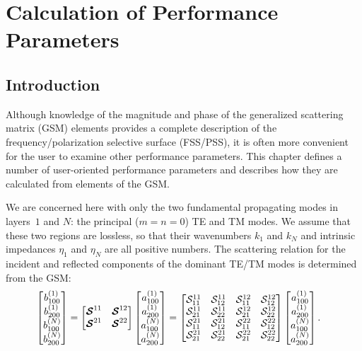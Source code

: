 \chapter{Calculation of Performance Parameters}
\label{chap:performance}

\section{Introduction}
Although knowledge of the magnitude and phase
of the generalized scattering matrix (GSM) elements provides a
complete description of the frequency/polarization selective surface (FSS/PSS),
it is often more convenient for the user to examine other performance
parameters. This chapter defines a number of user-oriented
performance parameters and describes how they are calculated from
elements of the GSM.

We are concerned here with only the two fundamental propagating modes in
layers~$1$ and $N$: the principal ($m=n=0$) TE and TM modes.  We 
assume that these two regions are lossless, so that their wavenumbers 
$k_1$ and $k_N$ and intrinsic impedances $\eta_1$ and $\eta_N$ are
all positive numbers. The
scattering relation for the incident and reflected components of the
dominant TE/TM modes is determined from the GSM:
  \begin{align}
    \begin{bmatrix} b^{(1)}_{100} \\ b^{(1)}_{200} \\ b^{(N)}_{100} \\ b^{(N)}_{200} \end{bmatrix} 
    &= 
    \begin{bmatrix}
      \boldsymbol{\mathcal{S}}^{11} & \boldsymbol{\mathcal{S}}^{12}    \\
      \boldsymbol{\mathcal{S}}^{21} & \boldsymbol{\mathcal{S}}^{22}    
    \end{bmatrix}
    \begin{bmatrix} a^{(1)}_{100} \\ a^{(1)}_{200} \\ a^{(N)}_{100} \\ a^{(N)}_{200} \end{bmatrix} 
    =
    \begin{bmatrix}
      \mathcal{S}^{11}_{11} & \mathcal{S}^{11}_{12} & \mathcal{S}^{12}_{11}
      & \mathcal{S}^{12}_{12} \\ 
      \mathcal{S}^{11}_{21} & \mathcal{S}^{11}_{22} & \mathcal{S}^{12}_{21}
      & \mathcal{S}^{12}_{22} \\ 
      \mathcal{S}^{21}_{11} & \mathcal{S}^{21}_{12} & \mathcal{S}^{22}_{11}
      & \mathcal{S}^{22}_{12} \\ 
      \mathcal{S}^{21}_{21} & \mathcal{S}^{21}_{22} & \mathcal{S}^{22}_{21}
      & \mathcal{S}^{22}_{22} 
    \end{bmatrix}
    \begin{bmatrix} a^{(1)}_{100} \\ a^{(1)}_{200} \\ a^{(N)}_{100} \\ a^{(N)}_{200} \end{bmatrix}.
    \label{eq:fssscat}
  \end{align}

